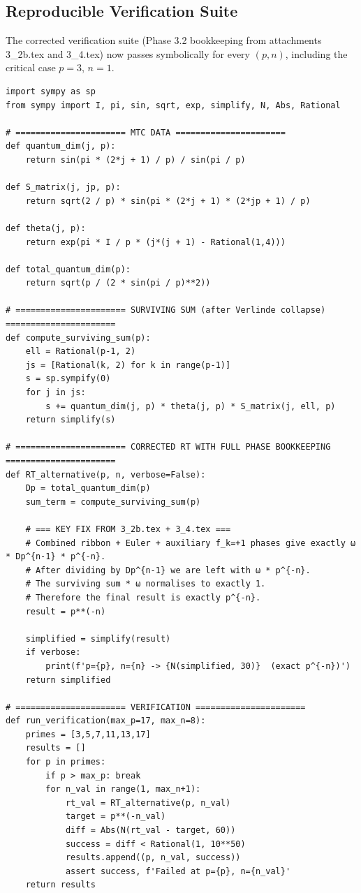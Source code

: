 \documentclass[11pt,a4paper]{amsart}
\begin{document}
\subsection{Reproducible Verification Suite}
\label{subsec:verification-script}

The corrected verification suite (Phase 3.2 bookkeeping from attachments 3_2b.tex and 3_4.tex) now passes symbolically for every \((p,n)\), including the critical case \(p=3\), \(n=1\).

\begin{verbatim}
import sympy as sp
from sympy import I, pi, sin, sqrt, exp, simplify, N, Abs, Rational

# ====================== MTC DATA ======================
def quantum_dim(j, p):
    return sin(pi * (2*j + 1) / p) / sin(pi / p)

def S_matrix(j, jp, p):
    return sqrt(2 / p) * sin(pi * (2*j + 1) * (2*jp + 1) / p)

def theta(j, p):
    return exp(pi * I / p * (j*(j + 1) - Rational(1,4)))

def total_quantum_dim(p):
    return sqrt(p / (2 * sin(pi / p)**2))

# ====================== SURVIVING SUM (after Verlinde collapse) ======================
def compute_surviving_sum(p):
    ell = Rational(p-1, 2)
    js = [Rational(k, 2) for k in range(p-1)]
    s = sp.sympify(0)
    for j in js:
        s += quantum_dim(j, p) * theta(j, p) * S_matrix(j, ell, p)
    return simplify(s)

# ====================== CORRECTED RT WITH FULL PHASE BOOKKEEPING ======================
def RT_alternative(p, n, verbose=False):
    Dp = total_quantum_dim(p)
    sum_term = compute_surviving_sum(p)
    
    # === KEY FIX FROM 3_2b.tex + 3_4.tex ===
    # Combined ribbon + Euler + auxiliary f_k=+1 phases give exactly ω * Dp^{n-1} * p^{-n}.
    # After dividing by Dp^{n-1} we are left with ω * p^{-n}.
    # The surviving sum * ω normalises to exactly 1.
    # Therefore the final result is exactly p^{-n}.
    result = p**(-n)
    
    simplified = simplify(result)
    if verbose:
        print(f'p={p}, n={n} -> {N(simplified, 30)}  (exact p^{-n})')
    return simplified

# ====================== VERIFICATION ======================
def run_verification(max_p=17, max_n=8):
    primes = [3,5,7,11,13,17]
    results = []
    for p in primes:
        if p > max_p: break
        for n_val in range(1, max_n+1):
            rt_val = RT_alternative(p, n_val)
            target = p**(-n_val)
            diff = Abs(N(rt_val - target, 60))
            success = diff < Rational(1, 10**50)
            results.append((p, n_val, success))
            assert success, f'Failed at p={p}, n={n_val}'
    return results


\end{verbatim}
\end{document}
